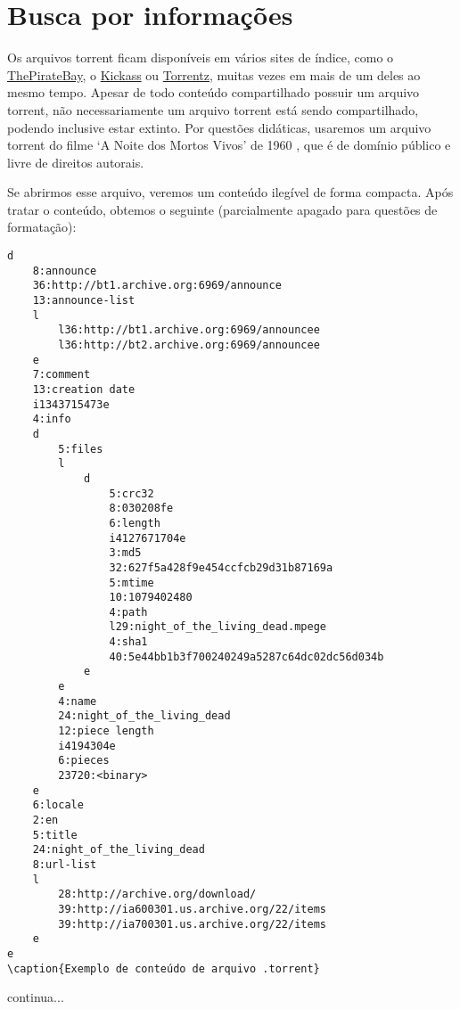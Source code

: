 \section{Busca por informações}

Os arquivos \gls*{torrent} ficam disponíveis em vários sites de índice, como o
\href{http://thepiratebay.sx/}{ThePirateBay}, o \href{http://kickass.to/}{Kickass} ou
\href{https://torrentz.eu/}{Torrentz}, muitas vezes em mais de um deles ao mesmo tempo.
Apesar de todo conteúdo compartilhado possuir um arquivo \gls*{torrent}, não
necessariamente um arquivo \gls*{torrent} está sendo compartilhado, podendo inclusive
estar extinto. Por questões didáticas, usaremos um arquivo torrent do filme `A Noite
dos Mortos Vivos' de 1960 \cite{torrent-file}, que é de domínio público e livre de
direitos autorais.

Se abrirmos esse arquivo, veremos um conteúdo ilegível de forma compacta. Após tratar o
conteúdo, obtemos o seguinte (parcialmente apagado para questões de formatação):

\begin{verbatim}
d
    8:announce
    36:http://bt1.archive.org:6969/announce
    13:announce-list
    l
        l36:http://bt1.archive.org:6969/announcee
        l36:http://bt2.archive.org:6969/announcee
    e
    7:comment
    13:creation date
    i1343715473e
    4:info
    d
        5:files
        l
            d
                5:crc32
                8:030208fe
                6:length
                i4127671704e
                3:md5
                32:627f5a428f9e454ccfcb29d31b87169a
                5:mtime
                10:1079402480
                4:path
                l29:night_of_the_living_dead.mpege
                4:sha1
                40:5e44bb1b3f700240249a5287c64dc02dc56d034b
            e
        e
        4:name
        24:night_of_the_living_dead
        12:piece length
        i4194304e
        6:pieces
        23720:<binary>
    e
    6:locale
    2:en
    5:title
    24:night_of_the_living_dead
    8:url-list
    l
        28:http://archive.org/download/
        39:http://ia600301.us.archive.org/22/items
        39:http://ia700301.us.archive.org/22/items
    e
e
\caption{Exemplo de conteúdo de arquivo .torrent}
\end{verbatim}

continua...

